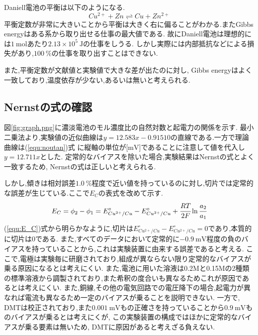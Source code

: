Daniell電池の平衡は以下のようになる.
\begin{equation}
  \label{equ:daniellheiko}
  Cu^{2+}+Zn \rightleftharpoons Cu+Zn^{2+}
\end{equation}
平衡定数が非常に大きいことから平衡は大きく右に偏ることがわかる.またGibbs energyはある系から取り出せる仕事の最大値である\cite{kagakunetu}.
故にDaniell電池は理想的には$1\ \si{\mole}$あたり$2.13\times10^5\ \si{\joule}$の仕事をしうる.
しかし実際には内部抵抗などによる損失があり,$100\ \%$の仕事を取り出すことはできない.

また,平衡定数が文献値と実験値で大きな差が出たのに対し, Gibbs energyはよく一致しており,温度依存が少ない,あるいは無いと考えられる.
\subsection{Nernstの式の確認}
図\ref{fig:graph.png}に濃淡電池のモル濃度比の自然対数と起電力の関係を示す.
最小二乗法より,実験値の近似曲線は$y=12.583x-0.91510$の直線である.一方で理論曲線は(\ref{equ:noutan})式
に縦軸の単位が[$\si{\milli\volt}$]であることに注意して値を代入し$y=12.711x$とした.
定常的なバイアスを除いた場合,実験結果はNernstの式とよく一致するため, Nernstの式は正しいと考えられる.

しかし,傾きは相対誤差$1.0\ \%$程度で近い値を持っているのに対し,切片では定常的な誤差が生じている.ここで$E_C$の表式を改めて示す.
\begin{equation}
  \label{equ:E_C}
  E_C=\phi_2-\phi_1=E^{\circ}_{Cu^{2+}/Cu}-E^{\circ}_{Cu^{2+}/Cu}+\cfrac{RT}{2F}\ln \cfrac{a_2}{a_1}
\end{equation}
(\ref{equ:E_C})式から明らかなように,切片は$E^{\circ}_{Cu^{2+}/Cu}-E^{\circ}_{Cu^{2+}/Cu}=0$であり,本質的に切片は0である.
また,すべてのデータにおいて定常的に$-0.9\ \si{\milli\volt}$程度の負のバイアスを持っていることから,これは実験装置に由来する誤差であると考える.
ここで,電極は実験毎に研磨されており,組成が異ならない限り定常的なバイアスが乗る原因になるとは考えにくい.
また,電池に用いた溶液は0.2Mと0.15Mの2種類の標準溶液から調製されており,また希釈の度合いも異なるためこれが原因であるとは考えにくい.
また,銅線,その他の電気回路での電圧降下の場合,起電力が異なれば電流も異なるため一定のバイアスが乗ることを説明できない.
一方で, DMTは校正されており,また$0.001\ \si{\milli\volt}$もの正確さを持っていることから$0.9\ \si{\milli\volt}$ものバイアスが乗るとは考えにくが,
この実験装置の構成ではほかに定常的なバイアスが乗る要素は無いため, DMTに原因があると考えざる負えない.
